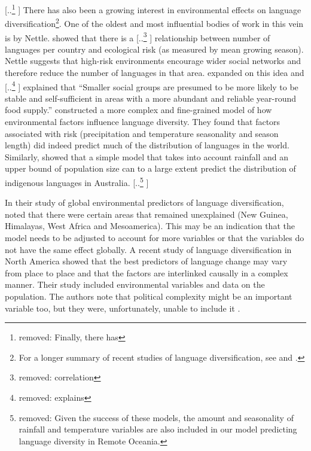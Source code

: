 \documentclass[unnumsec,webpdf,modern,medium]{oup-authoring-template}
\providecommand{\DIFaddtex}[1]{{\protect\color{blue} \sf #1}} %
\providecommand{\DIFdeltex}[1]{{\protect\color{red} [..\footnote{removed: #1} ]}} %
\providecommand{\DIFaddbegin}{} %
\providecommand{\DIFaddend}{} %
\providecommand{\DIFdelbegin}{} %
\providecommand{\DIFdelend}{} %
\providecommand{\DIFadd}[1]{\texorpdfstring{\DIFaddtex{#1}}{#1}} %
\providecommand{\DIFdel}[1]{\texorpdfstring{\DIFdeltex{#1}}{}} %
\newcommand{\DIFscaledelfig}{0.5}
\newlength{\DIFdelgraphicswidth} %
\newlength{\DIFdelgraphicsheight} %
\newcommand{\DIFaddincludegraphics}[2][]{{\color{blue}\fbox{\DIFOincludegraphics[#1]{#2}}}} %
\newcommand{\DIFdelincludegraphics}[2][]{%
\sbox{\DIFdelgraphicsbox}{\DIFOincludegraphics[#1]{#2}}%
\settoboxwidth{\DIFdelgraphicswidth}{\DIFdelgraphicsbox} %
\settoboxtotalheight{\DIFdelgraphicsheight}{\DIFdelgraphicsbox} %
\scalebox{\DIFscaledelfig}{%
\parbox[b]{\DIFdelgraphicswidth}{\usebox{\DIFdelgraphicsbox}\\[-\baselineskip] \rule{\DIFdelgraphicswidth}{0em}}\llap{\resizebox{\DIFdelgraphicswidth}{\DIFdelgraphicsheight}{%
\setlength{\unitlength}{\DIFdelgraphicswidth}%
\begin{picture}(1,1)%
\thicklines\linethickness{2pt} %
{\color[rgb]{1,0,0}\put(0,0){\framebox(1,1){}}}%
{\color[rgb]{1,0,0}\put(0,0){\line( 1,1){1}}}%
{\color[rgb]{1,0,0}\put(0,1){\line(1,-1){1}}}%
\end{picture}%
}\hspace*{3pt}}} %
} %
\DeclareRobustCommand{\DIFaddbegin}{\DIFOaddbegin \let\includegraphics\DIFaddincludegraphics} %
\DeclareRobustCommand{\DIFaddend}{\DIFOaddend \let\includegraphics\DIFOincludegraphics} %
\DeclareRobustCommand{\DIFdelbegin}{\DIFOdelbegin \let\includegraphics\DIFdelincludegraphics} %
\DeclareRobustCommand{\DIFdelend}{\DIFOaddend \let\includegraphics\DIFOincludegraphics} %
\begin{document}
\DIFdelbegin \DIFdel{Finally, there has }\DIFdelend \DIFaddbegin \DIFadd{There has also }\DIFaddend been a growing interest in environmental effects on language diversification\footnote{For a longer summary of recent studies of language diversification, see \citet{gavin2013toward} and \citet{greenhill2015demographic}.}. One of the oldest and most influential bodies of work in this vein is by Nettle. \citet{NETTLE1998} showed that there is a \DIFdelbegin \DIFdel{correlation }\DIFdelend \DIFaddbegin \DIFadd{relationship }\DIFaddend between number of languages per country and ecological risk (as measured by mean growing season). Nettle suggests that high-risk environments encourage wider social networks and therefore reduce the number of languages in that area. \citet{hua2019ecological} expanded on this idea and \DIFdelbegin \DIFdel{explains }\DIFdelend \DIFaddbegin \DIFadd{explained }\DIFaddend that ``Smaller social groups are presumed to be more likely to be stable and self-sufficient in areas with a more abundant and reliable year-round food supply.'' \citet{hua2019ecological} constructed a more complex and fine-grained model of how environmental factors influence language diversity. They found that factors associated with risk (precipitation and temperature seasonality and season length) did indeed predict much of the distribution of languages in the world. Similarly, \citet{gavin2017process} showed that a simple model that takes into account rainfall and an upper bound of population size can to a large extent predict the distribution of indigenous languages in Australia. 
\DIFdelbegin \DIFdel{Given the success of these models, the amount and seasonality of rainfall and temperature variables are also included in our model predicting language diversity in Remote Oceania. 
}\DIFdelend 


In their study of global environmental predictors of language diversification, \citet{hua2019ecological} noted that there were certain areas that remained unexplained (New Guinea, Himalayas, West Africa and Mesoamerica). This may be an indication that the model needs to be adjusted to account for more variables or that the variables do not have the same effect globally. A recent study of language diversification in North America \citep{Pacheco_Coelho_2019} showed that the best predictors of language change may vary from place to place and that the factors are interlinked causally in a complex manner. Their study included environmental variables and data on the population. The authors note that political complexity might be an important variable too, but they were, unfortunately, unable to include it \citep[7]{Pacheco_Coelho_2019}.
\end{document}
